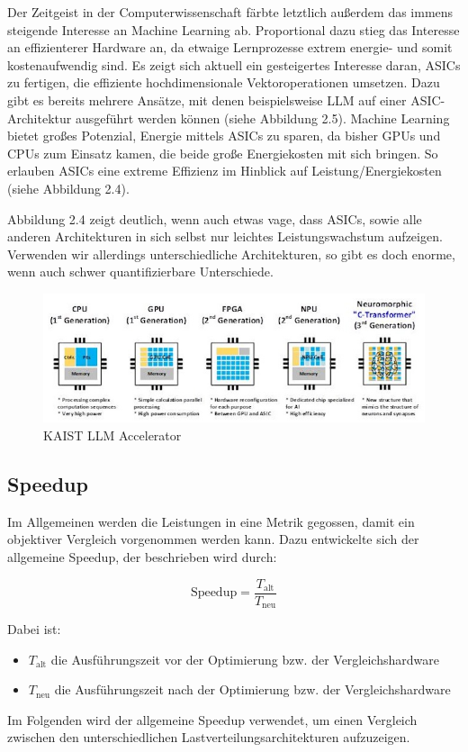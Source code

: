 Der Zeitgeist in der Computerwissenschaft färbte letztlich außerdem das immens steigende Interesse an Machine Learning ab. Proportional dazu stieg das Interesse an effizienterer Hardware an, da etwaige Lernprozesse extrem energie- und somit kostenaufwendig sind. Es zeigt sich aktuell ein gesteigertes Interesse daran, ASICs zu fertigen, die effiziente hochdimensionale Vektoroperationen umsetzen. Dazu gibt es bereits mehrere Ansätze, mit denen beispielsweise LLM auf einer ASIC-Architektur ausgeführt werden können (siehe Abbildung 2.5). Machine Learning bietet großes Potenzial, Energie mittels ASICs zu sparen, da bisher GPUs und CPUs zum Einsatz kamen, die beide große Energiekosten mit sich bringen. So erlauben ASICs eine extreme Effizienz im Hinblick auf Leistung/Energiekosten (siehe Abbildung 2.4).

Abbildung 2.4 zeigt deutlich, wenn auch etwas vage, dass ASICs, sowie alle anderen Architekturen in sich selbst nur leichtes Leistungswachstum aufzeigen. Verwenden wir allerdings unterschiedliche Architekturen, so gibt es doch enorme, wenn auch schwer quantifizierbare Unterschiede.
\begin{figure}
    \centering
    \includegraphics[width=0.8\linewidth]{images/lowpowerasic.png}
    \caption{KAIST LLM Accelerator \cite{kaist}}
    \label{fig:enter-label}
\end{figure}
\subsection{Speedup}
Im Allgemeinen werden die Leistungen in eine Metrik gegossen, damit ein objektiver Vergleich vorgenommen werden kann. Dazu entwickelte sich der allgemeine Speedup, der beschrieben wird durch: \cite{speedup}

\begin{equation}
\text{Speedup} = \frac{T_{\text{alt}}}{T_{\text{neu}}}
\end{equation}

Dabei ist:
\begin{itemize}
  \item $T_{\text{alt}}$ die Ausführungszeit vor der Optimierung bzw. der Vergleichshardware
  \item $T_{\text{neu}}$ die Ausführungszeit nach der Optimierung bzw. der Vergleichshardware
\end{itemize}
Im Folgenden wird der allgemeine Speedup verwendet, um einen Vergleich zwischen den unterschiedlichen Lastverteilungsarchitekturen aufzuzeigen.